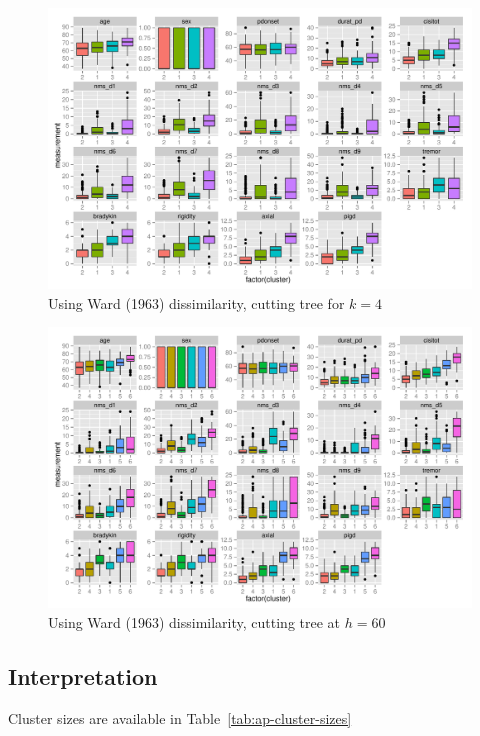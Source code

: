 \documentclass[letterpaper,12pt]{article}
\begin{document}
\begin{figure}[h]
  \centering
  \includegraphics[width=\linewidth]{hc-summaries-ward-D-k4.pdf}
  \caption{Using Ward (1963) dissimilarity, cutting tree for $k = 4$}
  \label{fig:hc-summaries-ward-D-k4}
\end{figure}

\begin{figure}[h]
  \centering
  \includegraphics[width=\linewidth]{hc-summaries-ward-D-h60.pdf}
  \caption{Using Ward (1963) dissimilarity, cutting tree at $h = 60$}
  \label{fig:hc-summaries-ward-D-h60}
\end{figure}


\subsection{Interpretation}

Cluster sizes are available in Table~\ref{tab:ap-cluster-sizes}
\end{document}
